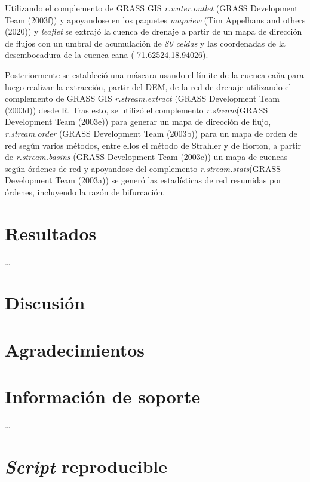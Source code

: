 \documentclass[11pt,]{article}
\begin{document}
Utilizando el complemento de GRASS GIS \emph{r.water.outlet} (GRASS
Development Team (2003f)) y apoyandose en los paquetes \emph{mapview}
(Tim Appelhans and others (2020)) y \emph{leaflet} se extrajó la cuenca
de drenaje a partir de un mapa de dirección de flujos con un umbral de
acumulación de \emph{80 celdas} y las coordenadas de la desembocadura de
la cuenca cana (-71.62524,18.94026).

Posteriormente se estableció una máscara usando el límite de la cuenca
caña para luego realizar la extracción, partir del DEM, de la red de
drenaje utilizando el complemento de GRASS GIS \emph{r.stream.extract}
(GRASS Development Team (2003d)) desde R. Tras esto, se utilizó el
complemento \emph{r.stream}(GRASS Development Team (2003e)) para generar
un mapa de dirección de flujo, \emph{r.stream.order} (GRASS Development
Team (2003b)) para un mapa de orden de red según varios métodos, entre
ellos el método de Strahler y de Horton, a partir de
\emph{r.stream.basins} (GRASS Development Team (2003c)) un mapa de
cuencas según órdenes de red y apoyandose del complemento
\emph{r.stream.stats}(GRASS Development Team (2003a)) se generó las
estadísticas de red resumidas por órdenes, incluyendo la razón de
bifurcación.

\section{Resultados}\label{resultados}

\ldots

\section{Discusión}\label{discusiuxf3n}

\section{Agradecimientos}\label{agradecimientos}

\section{Información de soporte}\label{informaciuxf3n-de-soporte}

\ldots

\section{\texorpdfstring{\emph{Script}
reproducible}{Script reproducible}}\label{script-reproducible}
\end{document}
